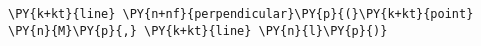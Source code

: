 \begin{Verbatim}[commandchars=\\\{\}]
    \PY{k+kt}{line} \PY{n+nf}{perpendicular}\PY{p}{(}\PY{k+kt}{point} \PY{n}{M}\PY{p}{,} \PY{k+kt}{line} \PY{n}{l}\PY{p}{)}
\end{Verbatim}
